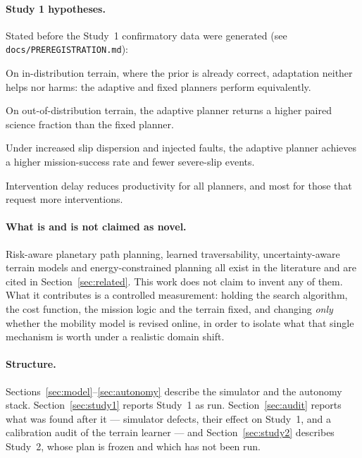 \documentclass[11pt]{article}
\begin{document}
\paragraph{Study 1 hypotheses.}
Stated before the Study~1 confirmatory data were generated (see
\texttt{docs/PREREGISTRATION.md}):
\begin{description}[leftmargin=2.2em,style=nextline]
  \item[H1] On in-distribution terrain, where the prior is already correct,
  adaptation neither helps nor harms: the adaptive and fixed planners perform
  equivalently.
  \item[H2] On out-of-distribution terrain, the adaptive planner returns a
  higher paired science fraction than the fixed planner.
  \item[H3] Under increased slip dispersion and injected faults, the adaptive
  planner achieves a higher mission-success rate and fewer severe-slip events.
  \item[H4] Intervention delay reduces productivity for all planners, and most
  for those that request more interventions.
\end{description}

\paragraph{What is and is not claimed as novel.}
Risk-aware planetary path planning, learned traversability, uncertainty-aware
terrain models and energy-constrained planning all exist in the literature and
are cited in Section~\ref{sec:related}. This work does not claim to invent any
of them. What it contributes is a controlled measurement: holding the search
algorithm, the cost function, the mission logic and the terrain fixed, and
changing \emph{only} whether the mobility model is revised online, in order to
isolate what that single mechanism is worth under a realistic domain shift.

\paragraph{Structure.}
Sections~\ref{sec:model}--\ref{sec:autonomy} describe the simulator and the
autonomy stack. Section~\ref{sec:study1} reports Study~1 as run. Section~\ref{sec:audit}
reports what was found after it --- simulator defects, their effect on
Study~1, and a calibration audit of the terrain learner --- and
Section~\ref{sec:study2} describes Study~2, whose plan is frozen and which has not been run.
\end{document}
